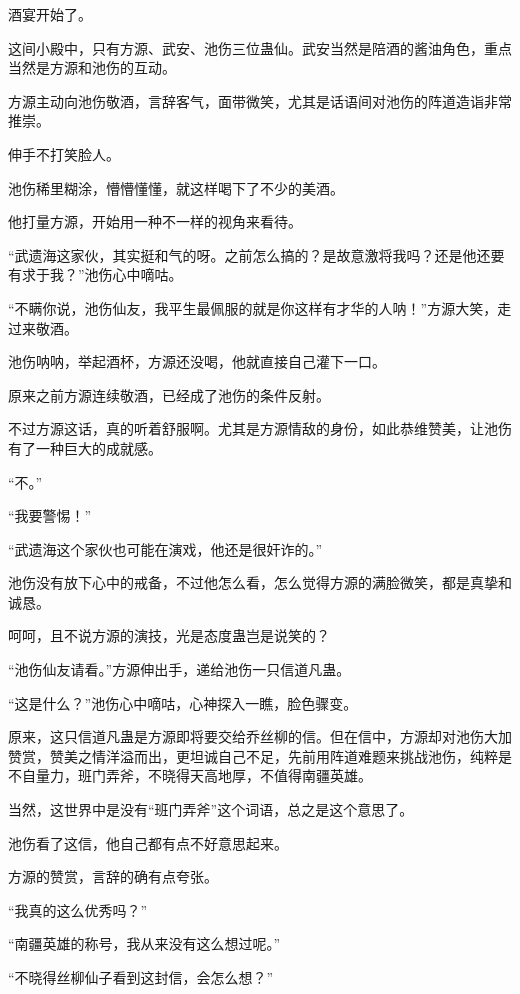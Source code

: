 
\begin{this_body}

酒宴开始了。

这间小殿中，只有方源、武安、池伤三位蛊仙。武安当然是陪酒的酱油角色，重点当然是方源和池伤的互动。

方源主动向池伤敬酒，言辞客气，面带微笑，尤其是话语间对池伤的阵道造诣非常推崇。

伸手不打笑脸人。

池伤稀里糊涂，懵懵懂懂，就这样喝下了不少的美酒。

他打量方源，开始用一种不一样的视角来看待。

“武遗海这家伙，其实挺和气的呀。之前怎么搞的？是故意激将我吗？还是他还要有求于我？”池伤心中嘀咕。

“不瞒你说，池伤仙友，我平生最佩服的就是你这样有才华的人呐！”方源大笑，走过来敬酒。

池伤呐呐，举起酒杯，方源还没喝，他就直接自己灌下一口。

原来之前方源连续敬酒，已经成了池伤的条件反射。

不过方源这话，真的听着舒服啊。尤其是方源情敌的身份，如此恭维赞美，让池伤有了一种巨大的成就感。

“不。”

“我要警惕！”

“武遗海这个家伙也可能在演戏，他还是很奸诈的。”

池伤没有放下心中的戒备，不过他怎么看，怎么觉得方源的满脸微笑，都是真挚和诚恳。

呵呵，且不说方源的演技，光是态度蛊岂是说笑的？

“池伤仙友请看。”方源伸出手，递给池伤一只信道凡蛊。

“这是什么？”池伤心中嘀咕，心神探入一瞧，脸色骤变。

原来，这只信道凡蛊是方源即将要交给乔丝柳的信。但在信中，方源却对池伤大加赞赏，赞美之情洋溢而出，更坦诚自己不足，先前用阵道难题来挑战池伤，纯粹是不自量力，班门弄斧，不晓得天高地厚，不值得南疆英雄。

当然，这世界中是没有“班门弄斧”这个词语，总之是这个意思了。

池伤看了这信，他自己都有点不好意思起来。

方源的赞赏，言辞的确有点夸张。

“我真的这么优秀吗？”

“南疆英雄的称号，我从来没有这么想过呢。”

“不晓得丝柳仙子看到这封信，会怎么想？”


\end{this_body}
